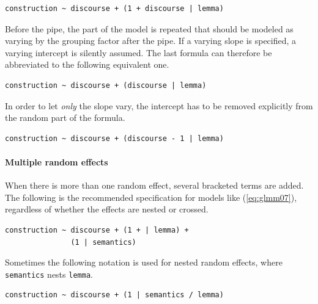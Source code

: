 \documentclass[a4paper,12pt]{article}
\begin{document}
\begin{lstlisting}
construction ~ discourse + (1 + discourse | lemma)
\end{lstlisting}

Before the pipe, the part of the model is repeated that should be modeled as varying by the grouping factor after the pipe.
If a varying slope is specified, a varying intercept is silently assumed.
The last formula can therefore be abbreviated to the following equivalent one.

\vspace{0.5\baselineskip}

\begin{lstlisting}
construction ~ discourse + (discourse | lemma)
\end{lstlisting}

In order to let \textit{only} the slope vary, the intercept has to be removed explicitly from the random part of the formula.

\vspace{0.5\baselineskip}

\begin{lstlisting}
construction ~ discourse + (discourse - 1 | lemma)
\end{lstlisting}

\paragraph{Multiple random effects}

When there is more than one random effect, several bracketed terms are added.
The following is the recommended specification for models like (\ref{eq:glmm07}), regardless of whether the effects are nested or crossed.

\vspace{0.5\baselineskip}

\begin{lstlisting}
construction ~ discourse + (1 + | lemma) +
               (1 | semantics)
\end{lstlisting}

Sometimes the following notation is used for nested random effects, where \texttt{semantics} nests \texttt{lemma}.

\vspace{0.5\baselineskip}

\begin{lstlisting}
construction ~ discourse + (1 | semantics / lemma)
\end{lstlisting}
\end{document}
